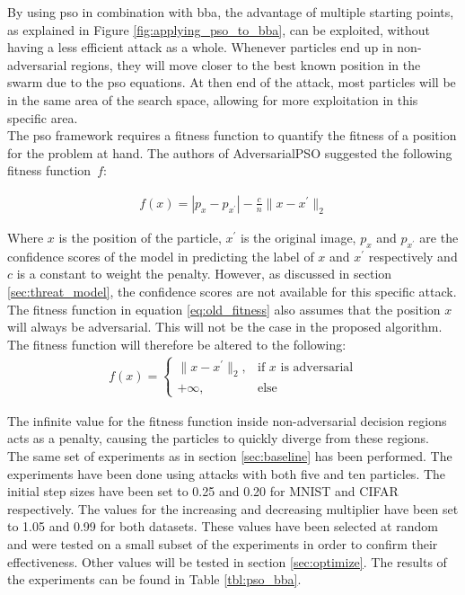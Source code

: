 By using \gls{pso} in combination with \gls{bba}, the advantage of multiple starting points, as explained in Figure \ref{fig:applying_pso_to_bba}, can be exploited, without having a less efficient attack as a whole. Whenever particles end up in non-adversarial regions, they will move closer to the best known position in the swarm due to the \gls{pso} equations. At then end of the attack, most particles will be in the same area of the search space, allowing for more exploitation in this specific area.\\

The \gls{pso} framework requires a fitness function to quantify the fitness of a position for the problem at hand. The authors of AdversarialPSO \cite{mosli2019they} suggested the following fitness function~$f$:

\begin{align}
	f(x) = |p_{x} - p_{x^{\prime}}| - \frac{c}{n}\|x-x^\prime\|_2   \label{eq:old_fitness}
\end{align}

Where $x$ is the position of the particle, $x^\prime$ is the original image, $p_{x}$ and $p_{x^\prime}$ are the confidence scores of the model in predicting the label of $x$ and $x^\prime$ respectively and $c$ is a constant to weight the penalty. However, as discussed in section \ref{sec:threat_model}, the confidence scores are not available for this specific attack. The fitness function in equation \ref{eq:old_fitness} also assumes that the position $x$ will always be adversarial. This will not be the case in the proposed algorithm. The fitness function will therefore be altered to the following:
\begin{align}
	f(x) = 
	\begin{cases}
 		\| x - x^\prime\|_2,	&\text{if } x \text{ is adversarial}\\
 		+\infty, 		& \text{else}
	\end{cases}
\end{align}

The infinite value for the fitness function inside non-adversarial decision regions acts as a penalty, causing the particles to quickly diverge from these regions.\\

The same set of experiments as in section \ref{sec:baseline} has been performed. The experiments have been done using attacks with both five and ten particles. The initial step sizes have been set to 0.25 and 0.20 for MNIST and CIFAR respectively. The values for the increasing and decreasing multiplier have been set to 1.05 and 0.99 for both datasets. These values have been selected at random and were tested on a small subset of the experiments in order to confirm their effectiveness. Other values will be tested in section \ref{sec:optimize}. The results of the experiments can be found in Table \ref{tbl:pso_bba}. \\


